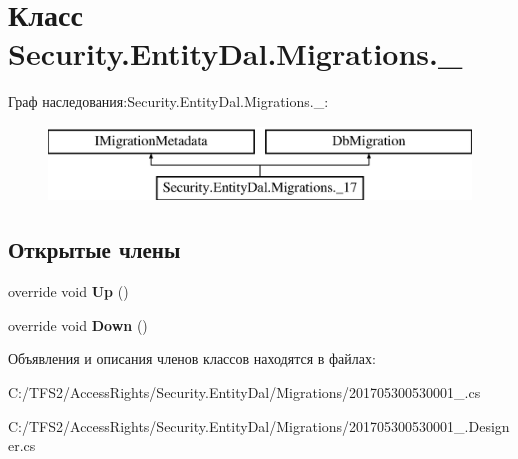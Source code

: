 \hypertarget{class_security_1_1_entity_dal_1_1_migrations_1_1__17}{}\section{Класс Security.\+Entity\+Dal.\+Migrations.\+\_}
\label{class_security_1_1_entity_dal_1_1_migrations_1_1__17}
Граф наследования\+:Security.\+Entity\+Dal.\+Migrations.\+\_\+:\begin{figure}[H]
\begin{center}
\leavevmode
\includegraphics[height=2.000000cm]{d9/df9/class_security_1_1_entity_dal_1_1_migrations_1_1__17}
\end{center}
\end{figure}
\subsection*{Открытые члены}
\begin{DoxyCompactItemize}
\item 
\mbox{\label{class_security_1_1_entity_dal_1_1_migrations_1_1__17_a451fe75d2b7813e4f0d9d4395c8192cf}} 
override void {\bfseries Up} ()
\item 
\mbox{\label{class_security_1_1_entity_dal_1_1_migrations_1_1__17_a8d3ccccaf84ce8f1afebf7d8902bad11}} 
override void {\bfseries Down} ()
\end{DoxyCompactItemize}


Объявления и описания членов классов находятся в файлах\+:\begin{DoxyCompactItemize}
\item 
C\+:/\+T\+F\+S2/\+Access\+Rights/\+Security.\+Entity\+Dal/\+Migrations/201705300530001\+\_.\+cs\item 
C\+:/\+T\+F\+S2/\+Access\+Rights/\+Security.\+Entity\+Dal/\+Migrations/201705300530001\+\_.\+Designer.\+cs\end{DoxyCompactItemize}

